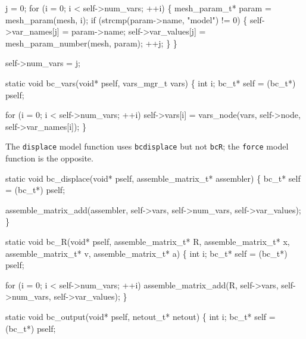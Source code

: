 j = 0;
for (i = 0; i < self->num_vars; ++i) \{
    mesh_param_t* param = mesh_param(mesh, i);
    if (strcmp(param->name, "model") != 0) \{
        self->var_names[j]  = param->name;
        self->var_values[j] = mesh_param_number(mesh, param);
        ++j;
    \}
\}

self->num_vars = j;

\nwendcode{}\nwdocspar

\nwenddocs{}\plusendmoddef
static void bc_vars(void* pself, vars_mgr_t vars)
\{
    int i;
    bc_t* self = (bc_t*) pself;

    for (i = 0; i < self->num_vars; ++i)
        self->vars[i] = vars_node(vars, self->node, self->var_names[i]);
\}

\nwendcode{}\nwdocspar

The {\tt{}displace} model function uses {\tt{}bc{}displace} but not
{\tt{}bc{}R}; the {\tt{}force} model function is the opposite.

\nwenddocs{}\plusendmoddef
static void bc_displace(void* pself, assemble_matrix_t* assembler)
\{
    bc_t* self = (bc_t*) pself;

    assemble_matrix_add(assembler, self->vars, self->num_vars, 
                        self->var_values);
\}

\nwendcode{}\nwdocspar

\nwenddocs{}\plusendmoddef
static void bc_R(void* pself, assemble_matrix_t* R, 
                 assemble_matrix_t* x,
                 assemble_matrix_t* v,
                 assemble_matrix_t* a)
\{
    int i;
    bc_t* self = (bc_t*) pself;

    for (i = 0; i < self->num_vars; ++i)
        assemble_matrix_add(R, self->vars, self->num_vars, 
                            self->var_values);
\}

\nwendcode{}\nwdocspar

\nwenddocs{}\plusendmoddef
static void bc_output(void* pself, netout_t* netout)
\{
    int i;
    bc_t* self = (bc_t*) pself;

